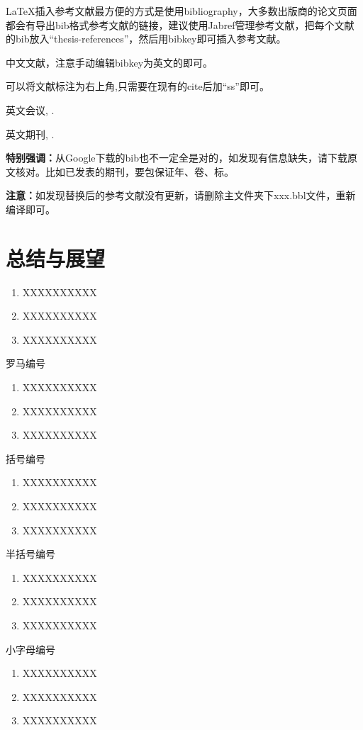 LaTeX\cite{lamport1994latex}插入参考文献最方便的方式是使用bibliography\cite{pritchard1969statistical}，大多数出版商的论文页面都会有导出bib格式参考文献的链接，建议使用Jabref管理参考文献，把每个文献的bib放入``thesis-references''，然后用bibkey即可插入参考文献。

中文文献\cite{zh-book-1}，注意手动编辑bibkey为英文的即可。

可以将文献标注为右上角,只需要在现有的cite后加“ss”即可。

英文会议\cite{Kraus2021Current}, \cite{WuYangLuEtAl2021}.

英文期刊\cite{LuoZengYuanEtAl2016}, \cite{Wu2022Boosting}.


\textbf{特别强调：}从Google下载的bib也不一定全是对的，如发现有信息缺失，请下载原文核对。比如已发表的期刊，要包保证年、卷、标。

\textbf{注意：}如发现替换后的参考文献没有更新，请删除主文件夹下xxx.bbl文件，重新编译即可。

\clearpage


\section{总结与展望}

\begin{enumerate}
 \item XXXXXXXXXX
 \label{item1}
 \item XXXXXXXXXX
 \item XXXXXXXXXX
\end{enumerate}
罗马编号
\begin{enumerate}[label=(\roman*)]
 \item XXXXXXXXXX
 \label{item2}
 \item XXXXXXXXXX
 \item XXXXXXXXXX
\end{enumerate}
括号编号
\begin{enumerate}[label=(\arabic*)]
 \item XXXXXXXXXX
 \label{item3}
 \item XXXXXXXXXX
 \item XXXXXXXXXX
\end{enumerate}
半括号编号
\begin{enumerate}[label=\arabic*)]
 \item XXXXXXXXXX
 \label{item4}
 \item XXXXXXXXXX
 \item XXXXXXXXXX
\end{enumerate}
小字母编号
\begin{enumerate}[label=\alph*)]
 \item XXXXXXXXXX
 \label{item5}
 \item XXXXXXXXXX
 \item XXXXXXXXXX
\end{enumerate}

